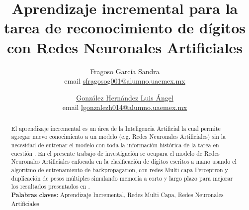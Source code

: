 \documentclass[10pt,a4paper]{article}
\title{Aprendizaje incremental para la tarea de reconocimiento
de dígitos con Redes Neuronales Artificiales}
\author{
    Fragoso García Sandra \\ email \href{mailto:sfragosog001@alumno.uaemex.mx}{sfragosog001@alumno.uaemex.mx}
    \and \underline{González Hernández Luis Ángel} \\ email \href{mailto:lgonzalezh014@alumno.uaemex.mx}{lgonzalezh014@alumno.uaemex.mx}
}
\begin{document}
    
    
    \maketitle
    \begin{abstract}
        El aprendizaje incremental es un área de la Inteligencia Artificial la cual permite agregar nuevo conocimiento 
        a un modelo (e.g. Redes Neuronales Artificiales) sin la necesidad de entrenar el modelo con toda la información 
        histórica de la tarea en cuestión \cite{bullinaria2009}. En el presente trabajo de investigación se ocupara el modelo de Redes 
        Neuronales Artificiales enfocada en la clasificación de dígitos escritos a mano usando el algoritmo de 
        entrenamiento de backpropagation, con redes Multi capa Perceptron y duplicación de pesos múltiples 
        simulando memoria a corto y largo plazo para mejorar los resultados presentados en \cite{bullinaria2009}.\\

        \textbf{Palabras claves:} Aprendizaje Incremental, Redes Multi Capa, Redes Neuronales Artificiales
    \end{abstract}

    
    
    
    
    
    
    
    
    
    
    
    

	
    
\end{document}
